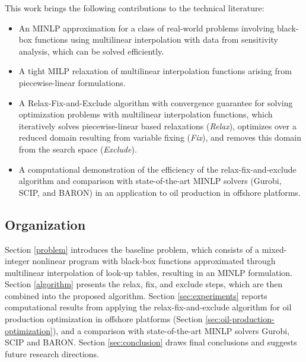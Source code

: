 \documentclass[pdflatex,sn-mathphys-num]{sn-jnl}%
\newcommand{\new}[1]{#1}
\begin{document}
This work brings the following contributions to the technical literature:
\begin{itemize}

  \item \new{An MINLP approximation for a class of real-world problems involving black-box functions using multilinear interpolation with data from sensitivity analysis, which can be solved efficiently.}

  \item \new{A tight MILP relaxation of multilinear interpolation functions arising from piecewise-linear formulations.}

  \item A Relax-Fix-and-Exclude algorithm with convergence guarantee for solving optimization problems with multilinear interpolation functions, which iteratively solves piecewise-linear based relaxations (\textit{Relax}), optimizes over a reduced domain resulting from variable fixing (\textit{Fix}), and removes this domain from the search space (\textit{Exclude}).

  \item A computational demonstration of the efficiency of the relax-fix-and-exclude algorithm and comparison with \new{state-of-the-art MINLP solvers (Gurobi, SCIP, and BARON)} in an application to oil production in offshore platforms. 
\end{itemize}



\subsection{Organization}

Section \ref{problem} introduces the baseline problem, which consists of a mixed-integer nonlinear program with black-box functions approximated through multilinear interpolation of look-up tables, resulting in an MINLP formulation.
Section \ref{algorithm} presents the relax, fix, and exclude steps, which are then combined into the proposed algorithm.
Section \ref{sec:experiments} reports computational results from applying the relax-fix-and-exclude algorithm for oil production optimization in offshore platforms \new{(Section \ref{sec:oil-production-optimization})}, and a comparison with state-of-the-art \new{MINLP solvers Gurobi, SCIP and BARON}.
    Section \ref{sec:conclusion} draws final conclusions and suggests future research directions.
    
\end{document}
